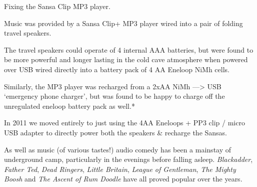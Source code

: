 \begin{marginfigure}
\checkoddpage \ifoddpage \forcerectofloat \else \forceversofloat \fi
\centering
 \caption{Fixing the Sansa Clip MP3 player. }
 \label{sansa fix}
\end{marginfigure}

Music was provided by a Sansa Clip+ MP3 player wired into a pair of folding travel speakers.

The travel speakers could operate of 4 internal AAA batteries, but were found to be more powerful and longer lasting in the cold cave atmosphere when powered over USB wired directly into a battery pack of 4 AA Eneloop NiMh cells.

Similarly, the MP3 player was recharged from a 2xAA NiMh
---\textgreater{} USB `emergency phone charger', but was found to be happy to charge off the unregulated eneloop battery pack as well.*
  
In 2011 we moved entirely to just using the 4AA Eneloops + PP3 clip /   micro USB adapter to directly power both the speakers \& recharge the Sansas.

As well as music (of various tastes!) audio comedy has been a mainstay of underground camp, particularly in the evenings before falling asleep. \textit{Blackadder}, \textit{Father Ted}, \textit{Dead Ringers}, \textit{Little Britain}, \textit{League of Gentleman}, \textit{The Mighty Boosh} and \textit{The Ascent of Rum Doodle} have all proved popular over the years.


